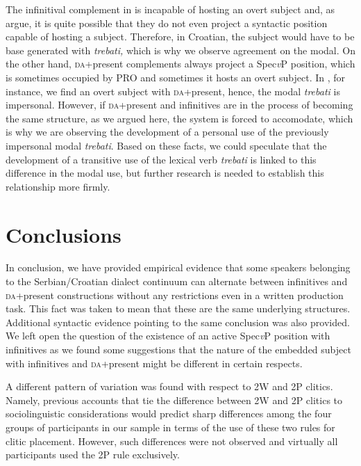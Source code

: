 \documentclass[output=paper,
modfonts,
newtxmath,
hidelinks,
]{langscibook}
\begin{document}
\noindent The infinitival complement in  is incapable of hosting an overt subject and, as \citet{TodorovicWurmbrand2015} argue, it is quite possible that they do not even project a syntactic position capable of hosting a subject. Therefore, in Croatian, the subject would have to be base generated with \textit{trebati,} which is why we observe agreement on the modal. On the other hand, \textsc{da}+present complements always project a Spec\textit{v}P position, which is sometimes occupied by PRO and sometimes it hosts an overt subject. In , for instance, we find an overt subject with \textsc{da}+present, hence, the modal \textit{trebati} is impersonal. However, if \textsc{da}+present and infinitives are in the process of becoming the same structure, as we argued here, the system is forced to accomodate, which is why we are observing the development of a personal use of the previously impersonal modal \textit{trebati}. Based on these facts, we could speculate that the development of a transitive use of the lexical verb \textit{trebati} is linked to this difference in the modal use, but further research is needed to establish this relationship more firmly.

\section{Conclusions}\label{s5}

In conclusion, we have provided empirical evidence that some speakers belonging to the Serbian/Croatian dialect continuum can alternate between infinitives and \textsc{da}+present constructions without any restrictions even in a written production task. This fact was taken to mean that these are the same underlying structures. Additional syntactic evidence pointing to the same conclusion was also provided. We left open the question of the existence of an active Spec\textit{v}P position with infinitives as we found some suggestions that the nature of the embedded subject with infinitives and \textsc{da}+present might be different in certain respects.

A different pattern of variation was found with respect to 2W and 2P clitics. Namely, previous accounts that tie the difference between 2W and 2P clitics to sociolinguistic considerations would predict sharp differences among the four groups of participants in our sample in terms of the use of these two rules for clitic placement. However, such differences were not observed and virtually all participants used the 2P rule exclusively.\largerpage
\end{document}
